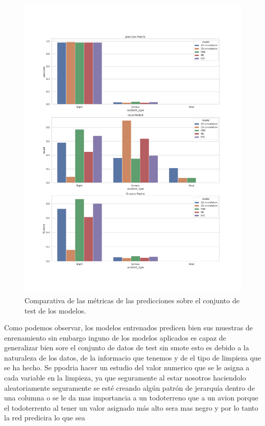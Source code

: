     \begin{figure}[h]
        \centering
        \includegraphics[width=16cm]{archivos/5.Resultados/ComparativaTest}
        \caption{Comparativa de las métricas de las predicciones sobre el conjunto de test de los modelos.}
        \label{ResultsTestImage}
     \end{figure}



Como podemos observar, los modelos entrenados predicen bien sus muestras de enrenamiento sin embargo inguno de los modelos aplicados es capaz de generalizar bien sore el conjunto de datos de test sin smote
esto es debido a la naturaleza de los datos, de la informacio que tenemos y de el tipo de limpieza que se ha hecho. Se ppodria hacer un estudio del valor numerico que se le asigna a cada variable en la limpieza, ya que seguramente al estar nosotros haciendolo aleatoriamente seguramente se esté creando algún patrón de jerarquía dentro de una columna o se le da mas importancia a un todoterreno que a un avion porque el todoterrento al tener un valor asignado más alto sera mas negro y por lo tanto la red predicira lo que sea